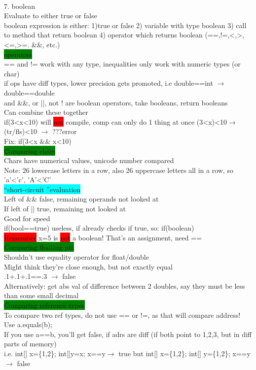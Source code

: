 ~\\ \color{Goldenrod}
7. boolean
\\ Evaluate to either true or false
\\ boolean expression is either: 1)true or false 2) variable with type boolean 3) call to method that return boolean 4) operator which returns boolean (==,!=,<,>,<=,>=. \&\&, etc.)
\\ \colorbox{Green}{operators}
\\ == and != work with any type, inequalities only work with numeric types (or char)
\\ if ops have diff types, lower precision gets promoted, i.e double==int $\rightarrow$ double==double
\\ and \&\&, or ||, not ! are boolean operators, take booleans, return booleans
\\ Can combine these together
\\ if(3<x<10) will \colorbox{Red}{not} compile, comp can only do 1 thing at once (3<x)<10$\rightarrow$ (tr/fls)<10 $\rightarrow$ ???error
\\ Fix: if(3<x \&\& x<10)
\\ \colorbox{Green}{Comparing chars}
\\ Chars have numerical values, unicode number compared
\\ Note: 26 lowercase letters in a row, also 26 uppercase letters all in a row, so 'a'<'c', 'A'<'C'
\\ \colorbox{Cyan}{\textquotedblleft short-circuit \textquotedblright evaluation}
\\ Left of \&\& false, remaining operands not looked at
\\ If left of || true, remaining not looked at
\\ Good for speed
\\ if(bool==true) useless, if already checks if true, so: if(boolean)
\\ \colorbox{Red}{Remember} x=5 is \colorbox{Red}{not} a boolean! That's an assignment, need ==
\\ \colorbox{Green}{Comparing floating pts}
\\ Shouldn't use equality operator for float/double
\\ Might think they're close enough, but not exactly equal
\\ .1+.1+.1==.3 $\rightarrow$ false
\\ Alternatively: get abs val of difference between 2 doubles, say they must be less than some small decimal
\\ \colorbox{Green}{Comparing reference types}
\\ To compare two ref types, do not use == or !=, as that will compare address! Use a.equals(b);
\\ If you use a==b, you'll get false, if adrs are diff (if both point to 1,2,3, but in diff parts of memory)
\\ i.e. int[] x=\{1,2\}; int[]y=x; x==y$\rightarrow$ true but int[] x=\{1,2\}; int[] y=\{1,2\}; x==y$\rightarrow$ false